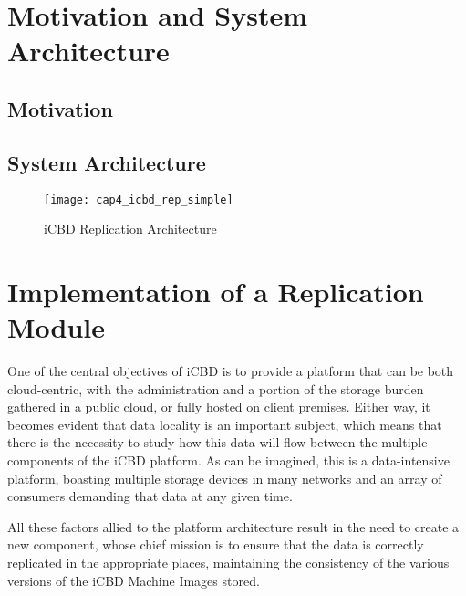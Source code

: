 \section{Motivation and System Architecture}
\label{sec:impl_mot_sysarch}

\subsection{Motivation}
\label{sub:impl_mot}

\subsection{System Architecture}
\label{sub:impl_sysarch}

\begin{figure}[htbp]
    \centering
    \texttt{[image: cap4\_icbd\_rep\_simple]}
    \caption{iCBD Replication Architecture}
    \label{fig:icbd_rep_arch}
\end{figure}

\section{Implementation of a Replication Module}
\label{sec:impl_icbdrep}

One of the central objectives of iCBD is to provide a platform that can be both cloud-centric, with the administration and a portion of the storage burden gathered in a public cloud, or fully hosted on client premises. Either way, it becomes evident that data locality is an important subject, which means that there is the necessity to study how this data will flow between the multiple components of the iCBD platform.
As can be imagined, this is a data-intensive platform, boasting multiple storage devices in many networks and an array of consumers demanding that data at any given time.

All these factors allied to the platform architecture result in the need to create a new component, whose chief mission is to ensure that the data is correctly replicated in the appropriate places, maintaining the consistency of the various versions of the iCBD Machine Images stored.



